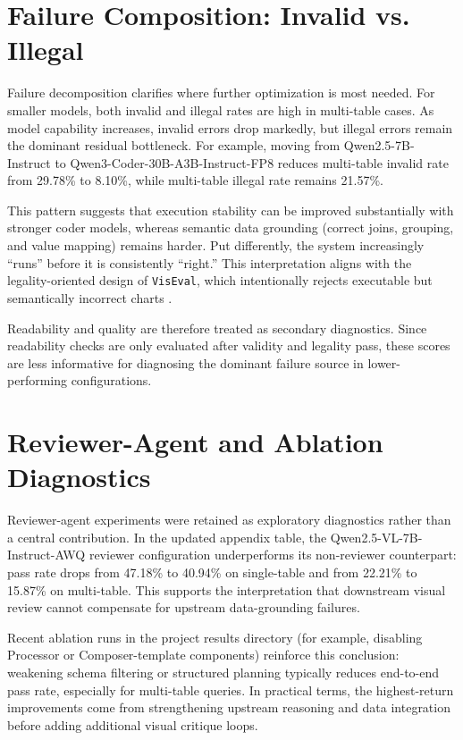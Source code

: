 \documentclass[a4paper,oneside,bibliography=totoc]{scrbook}
\begin{document}
\section{Failure Composition: Invalid vs. Illegal}

Failure decomposition clarifies where further optimization is most needed. For smaller models, both invalid and illegal rates are high in multi-table cases. As model capability increases, invalid errors drop markedly, but illegal errors remain the dominant residual bottleneck. For example, moving from Qwen2.5-7B-Instruct to Qwen3-Coder-30B-A3B-Instruct-FP8 reduces multi-table invalid rate from 29.78\% to 8.10\%, while multi-table illegal rate remains 21.57\%.

This pattern suggests that execution stability can be improved substantially with stronger coder models, whereas semantic data grounding (correct joins, grouping, and value mapping) remains harder. Put differently, the system increasingly ``runs'' before it is consistently ``right.'' This interpretation aligns with the legality-oriented design of \texttt{VisEval}, which intentionally rejects executable but semantically incorrect charts \cite{chen2025viseval}.

Readability and quality are therefore treated as secondary diagnostics. Since readability checks are only evaluated after validity and legality pass, these scores are less informative for diagnosing the dominant failure source in lower-performing configurations.

\section{Reviewer-Agent and Ablation Diagnostics}
\label{sec:results_qualitative}

Reviewer-agent experiments were retained as exploratory diagnostics rather than a central contribution. In the updated appendix table, the Qwen2.5-VL-7B-Instruct-AWQ reviewer configuration underperforms its non-reviewer counterpart: pass rate drops from 47.18\% to 40.94\% on single-table and from 22.21\% to 15.87\% on multi-table. This supports the interpretation that downstream visual review cannot compensate for upstream data-grounding failures.

Recent ablation runs in the project results directory (for example, disabling Processor or Composer-template components) reinforce this conclusion: weakening schema filtering or structured planning typically reduces end-to-end pass rate, especially for multi-table queries. In practical terms, the highest-return improvements come from strengthening upstream reasoning and data integration before adding additional visual critique loops.
\end{document}
